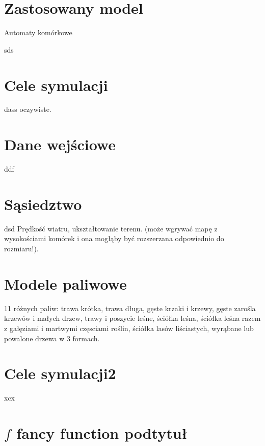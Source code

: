 \documentclass[a4paper, 11pt]{article}
\begin{document}
	
	\section{Zastosowany model}
	\indent
	Automaty komórkowe
	
	sds
	\section*{Cele symulacji}
	\indent
	dass
	oczywiste.
	
	\section*{Dane wejściowe}
	\indent
	ddf
	\section*{Sąsiedztwo}
	\indent	
	
	dsd
	Prędkość wiatru, ukształtowanie terenu. (może wgrywać mapę z wysokościami komórek
	i ona mogłąby być rozszerzana odpowiednio do rozmiaru!).
	\section*{Modele paliwowe}
	\indent	
	
	11 różnych paliw: trawa krótka, trawa długa, gęste krzaki i krzewy, gęste zarośla krzewów i małych drzew, trawy i poszycie leśne, ściółka leśna, ściółka leśna razem z gałęziami i martwymi częsciami roślin, ściółka lasów liściastych, wyrąbane lub powalone drzewa w 3 formach.
	
	\section*{Cele symulacji2}
	\indent
	
	xcx
	\section*{$ f $ fancy function podtytuł}
	\indent
	\begin{figure}[H]%
	\end{figure}
\end{document}
